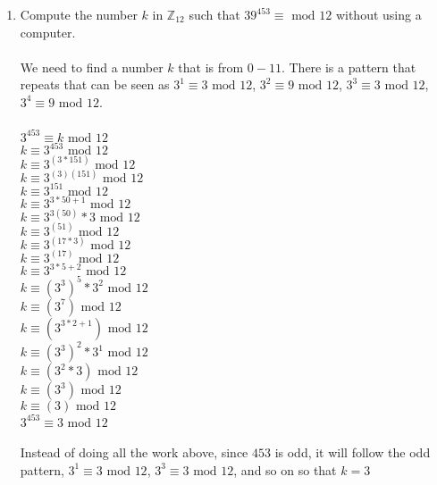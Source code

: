 \documentclass[]{article}
\begin{document}
\begin{enumerate}
    \item Compute the number $k$ in $\mathbb{Z}_{12}$ such that $39^{453} \equiv \text{ mod } 12$ without using a computer.
    \\\\ We need to find a number $k$ that is from $0-11$. There is a pattern that repeats that can be seen as $3^1 \equiv 3 \text{ mod }12$, $3^2 \equiv 9 \text{ mod }12$, $3^3 \equiv 3 \text{ mod }12$, $3^4 \equiv 9 \text{ mod }12$.
    \\\\$3^{453} \equiv k \text{ mod } 12$
    \\$k \equiv 3^{453} \text{ mod } 12$
    \\$k \equiv 3^{(3*151)} \text{ mod } 12$
    \\$k \equiv 3^{(3)(151)} \text{ mod } 12$
    \\$k \equiv 3^{151} \text{ mod } 12$
    \\$k \equiv 3^{3*50+1} \text{ mod } 12$
    \\$k \equiv 3^{3(50)}*3 \text{ mod } 12$
    \\$k \equiv 3^{(51)} \text{ mod } 12$
    \\$k \equiv 3^{(17*3)} \text{ mod } 12$
    \\$k \equiv 3^{(17)} \text{ mod } 12$
    \\$k \equiv 3^{3*5+2} \text{ mod } 12$
    \\$k \equiv (3^{3})^5*3^{2} \text{ mod } 12$
    \\$k \equiv (3^{7}) \text{ mod } 12$
    \\$k \equiv (3^{3*2+1}) \text{ mod } 12$
    \\$k \equiv (3^{3})^2*3^{1} \text{ mod } 12$
    \\$k \equiv (3^{2}*3) \text{ mod } 12$
    \\$k \equiv (3^{3}) \text{ mod } 12$
    \\$k \equiv (3) \text{ mod } 12$
    \\$3^{453} \equiv 3 \text{ mod } 12$
    \\\\Instead of doing all the work above, since $453$ is odd, it will follow the odd pattern, $3^1 \equiv 3 \text{ mod }12$, $3^3 \equiv 3 \text{ mod }12$, and so on so that $k=3$


\end{enumerate}
\end{document}
